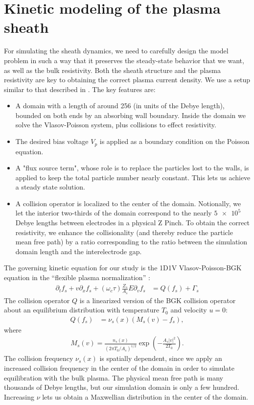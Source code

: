 \documentclass{article}
\begin{document}
\section{Kinetic modeling of the plasma sheath}

For simulating the sheath dynamics, we need to carefully design the model problem in such a way
that it preserves the steady-state behavior that we want, as well as the bulk resistivity.
Both the sheath structure and the plasma resistivity are key to obtaining the correct plasma current density.
We use a setup similar to that described in \cite{skolarContinuumKineticInvestigation2023}. The key features are:
\begin{itemize}
    \item A domain with a length of around 256 (in units of the Debye length), bounded on both ends by an absorbing wall boundary.
        Inside the domain we solve the Vlasov-Poisson system, plus collisions to effect resistivity.
    \item The desired bias voltage $V_p$ is applied as a boundary condition on the Poisson equation.
    \item A "flux source term", whose role is to replace the particles lost to the walls, is applied to keep the total particle
        number nearly constant. This lets us achieve a steady state solution.
    \item A collision operator is localized to the center of the domain. Notionally, we let the interior two-thirds of the domain
        correspond to the nearly $\num{5e5}$ Debye lengths between electrodes in a physical Z Pinch.
        To obtain the correct resistivity, we enhance the collisionality (and thereby reduce the particle mean free path) by a
        ratio corresponding to the ratio between the simulation domain length and the interelectrode gap.
\end{itemize}


The governing kinetic equation for our study is the 1D1V Vlasov-Poisson-BGK equation in
the ``flexible plasma normalization'' \cite{millerMultispecies13momentModel2016}:
\begin{align}
    \label{eqn:vlasov_bgk}
    \partial_t f_s + v \partial_x f_s + (\omega_c \tau) \frac{Z_s}{A_s} E \partial_v f_s &= Q(f_s) + \Gamma_s
\end{align}
The collision operator $Q$ is a linearized version of the BGK collision operator about an equilibrium
distribution with temperature $T_{0}$ and velocity $u = 0$:
\begin{align*}
    Q(f_s) &= \nu_s(x) (M_s(v) - f_s),
\end{align*}
where
\begin{align*}
    M_s(v) = \frac{n_s(x)}{(2\pi T_0/A_s)^{1/2}} \exp \left( -\frac{A_s|v|^2}{2T_0} \right).
\end{align*}
The collision frequency $\nu_s(x)$ is spatially dependent, since we apply an increased collision frequency in the center of the domain
in order to simulate equilibration with the bulk plasma.
The physical mean free path is many thousands of Debye lengths, but our simulation domain is only a few hundred.
Increasing $\nu$ lets us obtain a Maxwellian distribution in the center of the domain.
\end{document}
